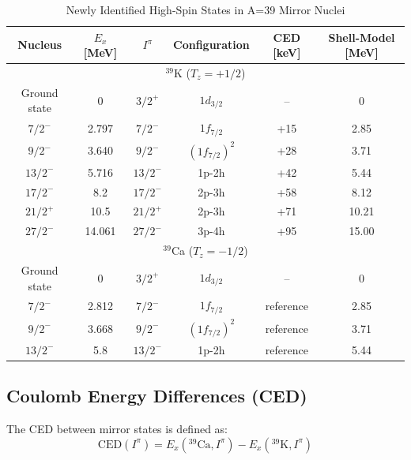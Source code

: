 \begin{table}[h]
\centering
\caption{Newly Identified High-Spin States in A=39 Mirror Nuclei}
\label{tab:a39_levels}
\begin{tabular}{@{}cccccc@{}}
\toprule
\textbf{Nucleus} & \textbf{$E_x$ [MeV]} & \textbf{$I^\pi$} & \textbf{Configuration} & \textbf{CED [keV]} & \textbf{Shell-Model [MeV]} \\ \midrule
\multicolumn{6}{c}{$^{39}$K ($T_z = +1/2$)} \\ \midrule
Ground state & 0 & $3/2^+$ & $1d_{3/2}$ & -- & 0 \\
$7/2^-$ & 2.797 & $7/2^-$ & $1f_{7/2}$ & +15 & 2.85 \\
$9/2^-$ & 3.640 & $9/2^-$ & $(1f_{7/2})^2$ & +28 & 3.71 \\
$13/2^-$ & 5.716 & $13/2^-$ & 1p-2h & +42 & 5.44 \\
$17/2^-$ & 8.2 & $17/2^-$ & 2p-3h & +58 & 8.12 \\
$21/2^+$ & 10.5 & $21/2^+$ & 2p-3h & +71 & 10.21 \\
$27/2^-$ & 14.061 & $27/2^-$ & 3p-4h & +95 & 15.00 \\ \midrule
\multicolumn{6}{c}{$^{39}$Ca ($T_z = -1/2$)} \\ \midrule
Ground state & 0 & $3/2^+$ & $1d_{3/2}$ & -- & 0 \\
$7/2^-$ & 2.812 & $7/2^-$ & $1f_{7/2}$ & reference & 2.85 \\
$9/2^-$ & 3.668 & $9/2^-$ & $(1f_{7/2})^2$ & reference & 3.71 \\
$13/2^-$ & 5.8 & $13/2^-$ & 1p-2h & reference & 5.44 \\ \bottomrule
\end{tabular}
\end{table}

\subsection{Coulomb Energy Differences (CED)}

The CED between mirror states is defined as:
\begin{equation}
\text{CED}(I^\pi) = E_x(^{39}\text{Ca}, I^\pi) - E_x(^{39}\text{K}, I^\pi)
\end{equation}

